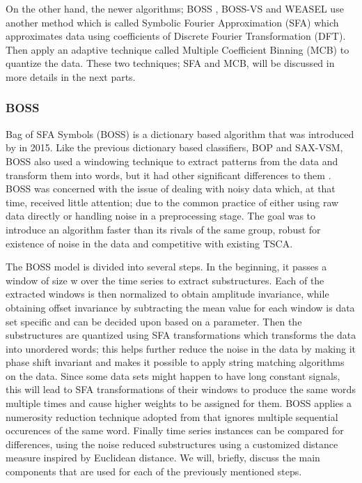 On the other hand, the newer algorithms; BOSS \cite{schafer2015boss}, BOSS-VS \cite{schafer2016scalable} and WEASEL \cite{schafer2017fast}
use another method which is called Symbolic Fourier Approximation (SFA) which approximates data using coefficients of Discrete Fourier Transformation (DFT).
Then apply an adaptive technique called Multiple Coefficient Binning (MCB) to quantize the data.
These two techniques; SFA and MCB, will be discussed in more details in the next parts.

\subsubsection{BOSS}
\label{SubsubsectionBOSS}
Bag of SFA Symbols (BOSS) is a dictionary based algorithm that was introduced by \cite{schafer2015boss} in 2015.
Like the previous dictionary based classifiers, BOP and SAX-VSM,
BOSS also used a windowing technique to extract patterns from the data and transform them into words, but it had other significant differences to them \cite{bagnall2017great}.
BOSS was concerned with the issue of dealing with noisy data which, at that time, received little attention; due to the common practice of
either using raw data directly or handling noise in a preprocessing stage. The goal was to introduce an algorithm faster than its rivals of the same group,
robust for existence of noise in the data and competitive with existing TSCA.

The BOSS model is divided into several steps. In the beginning, it passes a window of size w over the time series to extract substructures.
Each of the extracted windows is then normalized to obtain amplitude invariance, while obtaining offset invariance by subtracting the mean value
for each window is data set specific and can be decided upon based on a parameter.
Then the substructures are quantized using SFA transformations which transforms the data into unordered words;
this helps further reduce the noise in the data by making it phase shift invariant and makes it possible to apply string matching algorithms on the data.
Since some data sets might happen to have long constant signals, this will lead to SFA transformations of their windows to produce the same words multiple times
and cause higher weights to be assigned for them. BOSS applies a numerosity reduction technique adopted from \cite{lin2007experiencing,lin2012rotation}
that ignores multiple sequential occurences of the same word.
Finally time series instances can be compared for differences, using the noise reduced substructures using a customized distance measure inspired by Euclidean distance.
We will, briefly, discuss the main components that are used for each of the previously mentioned steps.

